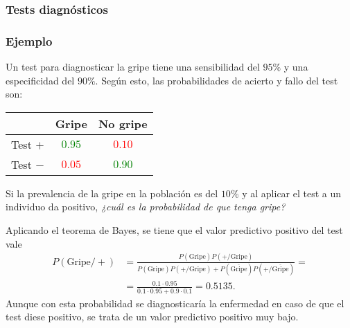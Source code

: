\begin{frame}
\frametitle{Tests diagnósticos}
\frametitle{Ejemplo}
Un test para diagnosticar la gripe tiene una sensibilidad del $95\%$ y una especificidad del $90\%$. Según esto, las probabilidades de
acierto y fallo del test son:
\begin{center}
\begin{tabular}{|c|c|c|}
\cline{2-3}
\multicolumn{1}{c|}{} & Gripe & No gripe\\ \hline
Test $+$ & \textcolor{green}{$0.95$} & \textcolor{red}{$0.10$}\\ \hline
Test $-$ & \textcolor{red}{$0.05$} & \textcolor{green}{$0.90$}\\ \hline
\end{tabular}
\end{center}

Si la prevalencia de la gripe en la población es del $10\%$ y al aplicar el test a un individuo da positivo, \emph{¿cuál es la probabilidad
de que tenga gripe?}

Aplicando el teorema de Bayes, se tiene que el valor predictivo positivo del test vale
\begin{align*}
P(\mbox{Gripe}/+) &= \frac{P(\mbox{Gripe})P(+/\mbox{Gripe})}{P(\mbox{Gripe})P(+/\mbox{Gripe})+P(\overline{\mbox{Gripe}})P(+/\overline{\mbox{Gripe}})} =\\
&= \frac{0.1\cdot 0.95}{0.1\cdot 0.95+0.9\cdot 0.1} = 0.5135.
\end{align*}
Aunque con esta probabilidad se diagnosticaría la enfermedad en caso de que el test diese positivo, se trata de un valor predictivo positivo
muy bajo. 

\end{frame}
